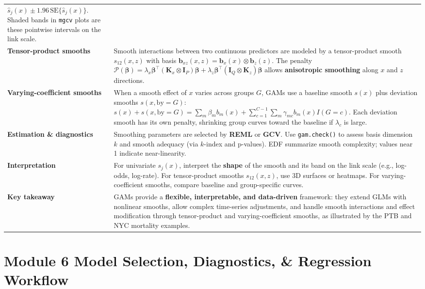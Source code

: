\documentclass[
  letterpaper,
  DIV=11,
  numbers=noendperiod]{scrreprt}
\begin{document}
\begin{longtable}[]{@{}
  >{\raggedright\arraybackslash}p{}
  >{\raggedright\arraybackslash}p{}@{}}
\(\hat{s}_j(x) \pm 1.96\,\mathrm{SE}\{\hat{s}_j(x)\}\). Shaded bands in
\texttt{mgcv} plots are these pointwise intervals on the link scale. \\
\textbf{Tensor-product smooths} & Smooth interactions between two
continuous predictors are modeled by a tensor-product smooth
\(s_{12}(x,z)\) with basis
\(\mathbf{b}_{xz}(x,z) = \mathbf{b}_x(x)\otimes\mathbf{b}_z(z)\). The
penalty
\(\mathcal{P}(\boldsymbol{\beta}) = \lambda_x \boldsymbol{\beta}^\top (\mathbf{K}_x \otimes \mathbf{I}_P)\boldsymbol{\beta} + \lambda_z \boldsymbol{\beta}^\top (\mathbf{I}_Q \otimes \mathbf{K}_z)\boldsymbol{\beta}\)
allows \textbf{anisotropic smoothing} along \(x\) and \(z\)
directions. \\
\textbf{Varying-coefficient smooths} & When a smooth effect of \(x\)
varies across groups \(G\), GAMs use a baseline smooth \(s(x)\) plus
deviation smooths \(s(x,\text{by}=G)\):
\(s(x) + s(x,\text{by}=G) = \sum_m \beta_m b_m(x) + \sum_{c=1}^{C-1}\sum_m \gamma_{mc} b_m(x) I(G=c).\)
Each deviation smooth has its own penalty, shrinking group curves toward
the baseline if \(\lambda_c\) is large. \\
\textbf{Estimation \& diagnostics} & Smoothing parameters are selected
by \textbf{REML} or \textbf{GCV}. Use \texttt{gam.check()} to assess
basis dimension \(k\) and smooth adequacy (via \(k\)-index and
p-values). EDF summarize smooth complexity; values near 1 indicate
near-linearity. \\
\textbf{Interpretation} & For univariate \(s_j(x)\), interpret the
\textbf{shape} of the smooth and its band on the link scale (e.g.,
log-odds, log-rate). For tensor-product smooths \(s_{12}(x,z)\), use 3D
surfaces or heatmaps. For varying-coefficient smooths, compare baseline
and group-specific curves. \\
\textbf{Key takeaway} & GAMs provide a \textbf{flexible, interpretable,
and data-driven} framework: they extend GLMs with nonlinear smooths,
allow complex time-series adjustments, and handle smooth interactions
and effect modification through tensor-product and varying-coefficient
smooths, as illustrated by the PTB and NYC mortality examples. \\
\end{longtable}


\hypertarget{module-6-model-selection-diagnostics-regression-workflow}{%
\chapter*{Module 6 Model Selection, Diagnostics, \& Regression
Workflow}\label{module-6-model-selection-diagnostics-regression-workflow}}
\end{document}

